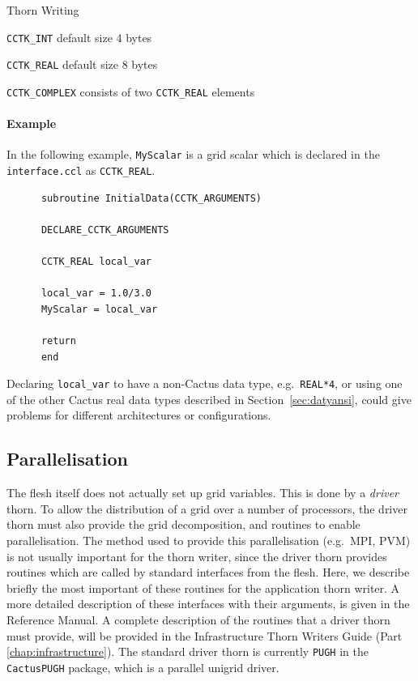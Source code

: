 \begin{cactuspart}{Thorn Writing}
\begin{Lentry}

\item[\texttt{CCTK\_INT}] default size 4 bytes
\item[\texttt{CCTK\_REAL}] default size 8 bytes
\item[\texttt{CCTK\_COMPLEX}] consists of two \texttt{CCTK\_REAL} elements

\end{Lentry}

\paragraph{Example}

In the following example, \verb|MyScalar| is a grid scalar which
is declared in the \texttt{interface.ccl} as \texttt{CCTK\_REAL}.
%
\begin{verbatim}
      subroutine InitialData(CCTK_ARGUMENTS)

      DECLARE_CCTK_ARGUMENTS

      CCTK_REAL local_var

      local_var = 1.0/3.0
      MyScalar = local_var

      return
      end
\end{verbatim}
%
Declaring \texttt{local\_var} to have a non-Cactus data type, e.g.\
\texttt{REAL*4}, or using one of the other Cactus real data types
described in Section~\ref{sec:datyansi}, could give problems for
different architectures or configurations.


\subsection{Parallelisation}
\label{sec:parallelisation}

The flesh itself does not actually set up grid variables. This
is done by a \textit{driver} thorn. To allow the distribution of
a grid over a number of processors, the driver thorn must
also provide the grid decomposition, and routines to enable
parallelisation. The method used to provide this parallelisation
(e.g.\ MPI, PVM) is not usually important for the thorn writer, since
the driver thorn provides routines which are called by standard interfaces
from the flesh. Here, we describe briefly the most important of these routines
for the application thorn writer. A more detailed description
of these interfaces with their arguments, is given in the Reference Manual.
A complete description of the
routines that a driver thorn must provide, will be provided in the
Infrastructure Thorn Writers Guide (Part \ref{chap:infrastructure}). The standard driver thorn is
currently \texttt{PUGH} in the \texttt{CactusPUGH} package, which
is a parallel unigrid driver.


\end{cactuspart}
